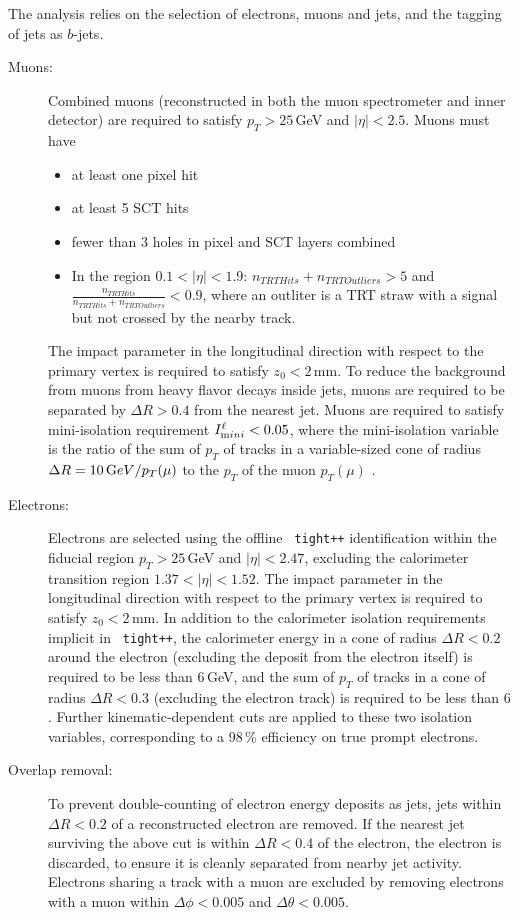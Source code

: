 The analysis relies on the selection of electrons, muons and jets, and
the tagging of jets as $b$-jets.
\begin{description}
\item[Muons:] Combined muons (reconstructed in both the muon spectrometer
and inner detector) are required to satisfy $p_T>25$\,GeV and $|\eta|<2.5$.  Muons must have
\begin{itemize}
\item at least one pixel hit
\item at least 5 SCT hits
\item fewer than 3 holes in pixel and SCT layers combined
\item In the region $0.1 < |\eta| < 1.9 $: $n_{TRT Hits} + n_{TRT Outliers} > 5$ and $\frac{n_{TRT Hits}}{n_{TRT Hits} + n_{TRT Outliers}} < 0.9$, where an outliter is a TRT straw with a signal but not crossed by the nearby track.
\end{itemize}

The impact parameter
in the longitudinal direction with respect to the primary vertex is
required to satisfy $z_0<2$\,mm.  To reduce the background from
muons from heavy flavor decays inside jets, muons are required to be
separated by $\Delta R>0.4$ from the nearest jet. Muons are required to satisfy 
mini-isolation requirement $I^\ell_{\textrm mini}<0.05$, where
the mini-isolation variable is the ratio of the sum of $p_T$ of tracks
in a variable-sized cone of radius $\Delta R=10\,{\textrm GeV}/p_T(\mu)$ to the $p_T$ of the muon $p_T(\mu)$ \cite{topreco}. %

\item[Electrons:] Electrons are selected using the offline \texttt{ tight++} 
identification within the fiducial region $p_T>25$\,GeV and $|\eta|<2.47$, 
excluding the calorimeter transition region $1.37<|\eta|<1.52$. The impact parameter
in the longitudinal direction with respect to the primary vertex is
required to satisfy $z_0<2$\,mm. In addition 
to the calorimeter isolation requirements implicit in \texttt{ tight++},
the calorimeter energy in a cone of radius $\Delta R<0.2$ around the
electron (excluding the deposit from the electron itself) is required
to be less than $6$\,GeV, and the sum of $p_T$ of tracks
in a cone of radius $\Delta R<0.3$ (excluding the electron track) is
required to be less than 6 \GeV. Further
kinematic-dependent cuts are applied to these two isolation variables,
corresponding to a 98\,\% efficiency on true prompt electrons. 
\item[Overlap removal:]
To prevent double-counting
of electron energy deposits as jets, jets within $\Delta R<0.2$ of 
a reconstructed electron are removed. If the nearest jet surviving
the above cut is within $\Delta R<0.4$ of the electron, the electron
is discarded, to ensure it is cleanly separated from nearby jet activity. Electrons sharing a track with a muon are excluded by removing electrons with a muon within $\Delta \phi < 0.005$ and $\Delta \theta < 0.005$.


\end{description}
